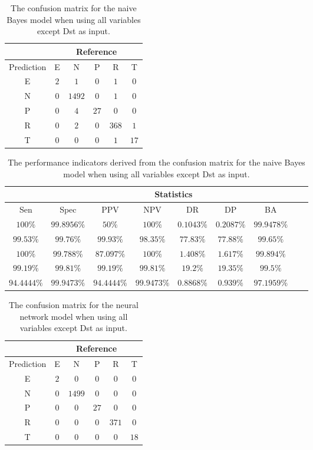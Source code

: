 \begin{table}[!ht]
	\centering
	\begin{tabular}{|c|c|c|c|c|c|}
		\hline
		 & \multicolumn{5}{|c|}{Reference} \\ \hline
		 Prediction & E & N & P & R & T \\ \hline
		 E & $2$ & $1$ & $0$ & $1$ & $0$ \\ \hline
		 N & $0$ & $1492$ & $0$ & $1$ & $0$ \\ \hline
		 P & $0$ & $4$ & $27$ & $0$ & $0$ \\ \hline
		 R & $0$ & $2$ & $0$ & $368$ & $1$ \\ \hline
		 T & $0$ & $0$ & $0$ & $1$ & $17$ \\ \hline
	\end{tabular}
	\caption{The confusion matrix for the naive Bayes model when using all variables except Dst as input.}
	\label{tab:cm:noDst:nb}
\end{table}

\begin{table}[!ht]
	\centering
	\begin{tabular}{|c|c|c|c|c|c|c|c|c|}
		\hline
		 & \multicolumn{7}{c|}{Statistics} \\ \hline
		Sen & Spec & PPV & NPV & DR & DP & BA \\ \hline
		$100\%$ & $99.8956\%$ & $50\%$ & $100\%$ & $0.1043\%$ & $0.2087\%$ & $99.9478\%$ \\ \hline
		$99.53\%$ & $99.76\%$ & $99.93\%$ & $98.35\%$ & $77.83\%$ & $77.88\%$ & $99.65\%$ \\ \hline
		$100\%$ & $99.788\%$ & $87.097\%$ & $100\%$ & $1.408\%$ & $1.617\%$ & $99.894\%$ \\ \hline
		$99.19\%$ & $99.81\%$ & $99.19\%$ & $99.81\%$ & $19.2\%$ & $19.35\%$ & $99.5\%$ \\ \hline
		$94.4444\%$ & $99.9473\%$ & $94.4444\%$ & $99.9473\%$ & $0.8868\%$ & $0.939\%$ & $97.1959\%$ \\ \hline
	\end{tabular}
	\caption{The performance indicators derived from the confusion matrix for the naive Bayes model when using all variables except Dst as input.}
	\label{tab:cs:noDst:nb}
\end{table}

\begin{table}[!ht]
	\centering
	\begin{tabular}{|c|c|c|c|c|c|}
		\hline
		 & \multicolumn{5}{|c|}{Reference} \\ \hline
		 Prediction & E & N & P & R & T \\ \hline
		 E & $2$ & $0$ & $0$ & $0$ & $0$ \\ \hline
		 N & $0$ & $1499$ & $0$ & $0$ & $0$ \\ \hline
		 P & $0$ & $0$ & $27$ & $0$ & $0$ \\ \hline
		 R & $0$ & $0$ & $0$ & $371$ & $0$ \\ \hline
		 T & $0$ & $0$ & $0$ & $0$ & $18$ \\ \hline
	\end{tabular}
	\caption{The confusion matrix for the neural network model when using all variables except Dst as input.}
	\label{tab:cm:noDst:nnet}
\end{table}

